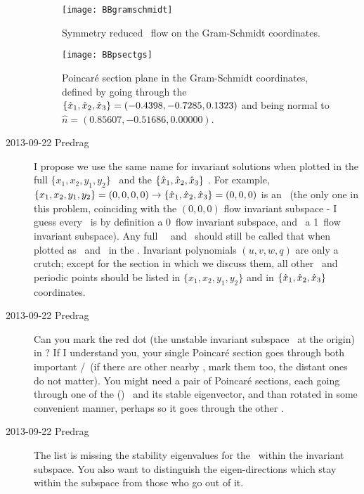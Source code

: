 \begin{description}
\begin{figure}%
  \begin{center}
  \texttt{[image: BBgramschmidt]}
  \end{center}
  \caption{
   Symmetry reduced \twoMode\ flow on the Gram-Schmidt coordinates.
 }
  \label{fig:BBgramschmidt}
\end{figure}

\begin{figure}%
  \begin{center}
  \texttt{[image: BBpsectgs]}
  \end{center}
  \caption{
	Poincar\'e section plane in the Gram-Schmidt coordinates, defined by
    going through the \reqv\
	$\{\hat{x}_1,\hat{x}_2,\hat{x}_3\} = (-0.4398, -0.7285, 0.1323)$
    and being normal to $\hat{n} =  (0.85607, -0.51686, 0.00000)$.
 }
  \label{fig:BBpsectgs}
\end{figure}

\item[2013-09-22 Predrag] I propose we use the same name for invariant
solutions when plotted in the full $\{x_1,x_2,y_1,y_2\}$ \statesp\ and
the $\{\hat{x}_1,\hat{x}_2,\hat{x}_3\}$ \reducedsp. For example, $\{x_1,x_2,y_1,y_2\} = (0,0,0,0) \to
\{\hat{x}_1,\hat{x}_2,\hat{x}_3\}  = (0,0,0)$ is an \eqv\ (the only one
in this problem, coinciding with the $(0,0,0)$ flow invariant subspace - I
guess every \eqv\ is by definition a 0\dmn\ flow invariant subspace, and
\reqv\ a 1\dmn\ flow invariant subspace). Any full \statesp\ \reqv\ and \rpo\
should still be called that when plotted as \eqv\ and \po\ in the
\reducedsp. Invariant polynomials $(u,v,w,q)$ are only a crutch; except
for the section in which we discuss them, all other \reqv\ and periodic
points should be listed in $\{x_1,x_2,y_1,y_2\}$ and in
$\{\hat{x}_1,\hat{x}_2,\hat{x}_3\}$ coordinates.


\item[2013-09-22 Predrag]
Can you mark the red dot (the unstable invariant subspace \eqv\ at the
origin) in  ? If I understand you, your single
Poincar\'e section goes through both important \eqva/\reqva\ (if there
are other nearby \reqva, mark them too, the distant ones do not matter).
You might need a pair of Poincar\'e sections, each going through one of
the (\reducedsp) \eqva\ and its stable eigenvector, and than rotated in
some convenient manner, perhaps so it goes through the other \eqv.

\item[2013-09-22 Predrag]
The list  is missing the stability
eigenvalues for the \reqv\ within the invariant subspace. You also want
to distinguish the eigen-directions which stay within the subspace from
those who go out of it.


\end{description}
